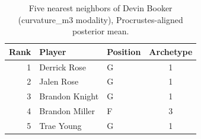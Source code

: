\begin{table}[htbp]
  \centering\small
  \begin{tabular}{rllc}
    \toprule
    Rank & Player & Position & Archetype \\
    \midrule
    1 & Derrick Rose & G & 1 \\
    2 & Jalen Rose & G & 1 \\
    3 & Brandon Knight & G & 1 \\
    4 & Brandon Miller & F & 3 \\
    5 & Trae Young & G & 1 \\
    \bottomrule
  \end{tabular}
  \caption{Five nearest neighbors of Devin Booker (curvature_m3 modality), Procrustes-aligned posterior mean.}
  \label{tab:Devin_Booker_neighbors_curvature_m3}
\end{table}

